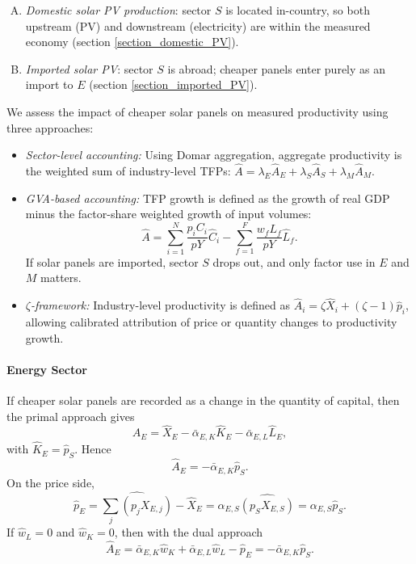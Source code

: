 \documentclass[11pt]{article}
\begin{document}
\begin{enumerate}[A.]
  \item \emph{Domestic solar PV production}: sector $S$ is located in-country, so both 
  upstream (PV) and downstream (electricity) are within the measured economy (section \ref{section_domestic_PV}).
  \item \emph{Imported solar PV}: sector $S$ is abroad; cheaper panels enter purely as an 
  import to $E$ (section \ref{section_imported_PV}).
\end{enumerate}

\noindent We assess the impact of cheaper solar panels on measured productivity using three approaches:
\begin{itemize}
    \item \textit{Sector-level accounting:} Using Domar aggregation, aggregate productivity is the weighted sum of industry-level TFPs: 
    \(\hat{A} = \lambda_E \hat{A}_E + \lambda_S \hat{A}_S + \lambda_M \hat{A}_M\).
    
    \item \textit{GVA-based accounting:} TFP growth is defined as the growth of real GDP minus the factor-share weighted growth of input volumes:
    \[
    \hat{A} = \sum_{i=1}^N \frac{p_i C_i}{pY} \hat{C}_i - \sum_{f=1}^F \frac{w_f L_f}{pY} \hat{L}_f.
    \]
    If solar panels are imported, sector \(S\) drops out, and only factor use in \(E\) and \(M\) matters.

    \item \textit{\(\zeta\)-framework:} Industry-level productivity is defined as 
    \(\hat{A}_i = \zeta \hat{X}_i + (\zeta - 1) \hat{p}_i\), 
    allowing calibrated attribution of price or quantity changes to productivity growth.
\end{itemize}




\paragraph{Energy Sector}
If cheaper solar panels are recorded as a change in the quantity of capital, then the primal approach gives
\[
\hat{A}_E=\hat{X}_E-\bar{\alpha}_{E,K}\hat{K}_E-\bar{\alpha}_{E,L}\hat{L}_E,
\]
with $\hat{K}_E=\hat{p}_S$. Hence
\[
\hat{A}_E=-\bar{\alpha}_{E,K}\hat{p}_S.
\]
On the price side,
\[
\hat{p}_E=\widehat{\sum_j(p_jX_{E,j})}-\hat{X}_E=\alpha_{E,S}\widehat{(p_SX_{E,S})}=\alpha_{E,S}\hat{p}_S.
\]
If $\hat{w}_L=0$ and $\hat{w}_K=0$, then with the dual approach
\[
\hat{A}_E=\bar{\alpha}_{E,K}\hat{w}_K+\bar{\alpha}_{E,L}\hat{w}_L-\hat{p}_E=-\bar{\alpha}_{E,K}\hat{p}_S.
\]
\end{document}
